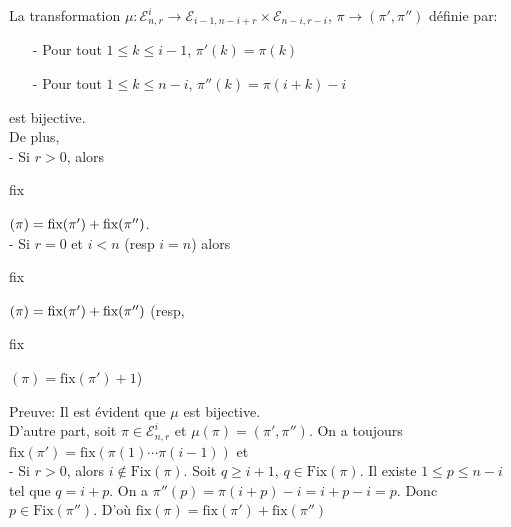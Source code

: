 \begin{proposition}\label{p7}
	La transformation $\mu: \mathcal{E}_{n, r}^{i} \longrightarrow \mathcal{E}_{i-1, n-i+r}\times \mathcal{E}_{n-i, r-i}$, $\pi \longrightarrow (\pi', \pi'')$ définie par:
	\begin{itemize}
		\item[-] Pour tout $1 \leq k \leq i-1 $, $\pi'(k) = \pi(k)$
		\item[-] Pour tout $1 \leq k \leq n-i$, $\pi''(k) = \pi(i+k)-i$
	\end{itemize}
	est bijective.\vspace{5pt}\\
	De plus, \\
	- Si $r>0$, alors \begin{rm}fix\end{rm}$(\pi) = \begin{rm}fix\end{rm}(\pi') + \begin{rm}fix\end{rm}(\pi'')$.\\
	- Si $r=0$ et $i<n$ (resp $i=n$) alors \begin{rm}fix\end{rm}$(\pi) = \begin{rm}fix\end{rm}(\pi') + \begin{rm}fix\end{rm}(\pi'')$ (resp, \begin{rm}fix\end{rm}$(\pi) = \text{fix}(\pi') + 1$)
\end{proposition}
Preuve: Il est évident que $\mu$ est bijective.\\
D'autre part, soit $\pi \in \mathcal{E}_{n, r}^{i}$ et $\mu(\pi)=(\pi', \pi'')$. On a toujours $\text{fix}(\pi') = \text{fix}(\pi(1)\cdots \pi(i-1))$ et\\
- Si $r>0$, alors $i \notin \text{Fix}(\pi)$. Soit $q\geq i+1$, $q\in \text{Fix}(\pi)$. Il existe $1 \leq p \leq n-i$ tel que $q=i+p$. On a $\pi''(p) = \pi(i+p) - i = i+p - i = p$. Donc $p \in \text{Fix}(\pi'')$. D'où $\text{fix}(\pi) =  \text{fix}(\pi') + \text{fix}(\pi'')$\\
